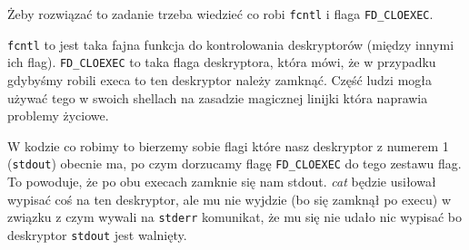 Żeby rozwiązać to zadanie trzeba wiedzieć co robi \texttt{fcntl} i flaga \texttt{FD\_CLOEXEC}.

\texttt{fcntl} to jest taka fajna funkcja do kontrolowania deskryptorów (między innymi ich flag). \texttt{FD\_CLOEXEC} to taka flaga deskryptora, która mówi, że w przypadku gdybyśmy robili execa to ten deskryptor należy zamknąć. Część ludzi mogła używać tego w swoich shellach na zasadzie magicznej linijki która naprawia problemy życiowe.

W kodzie co robimy to bierzemy sobie flagi które nasz deskryptor z numerem 1 (\texttt{stdout}) obecnie ma, po czym dorzucamy flagę \texttt{FD\_CLOEXEC} do tego zestawu flag. To powoduje, że po obu execach zamknie się nam stdout. \textit{cat} będzie usiłował wypisać coś na ten deskryptor, ale mu nie wyjdzie (bo się zamknął po execu) w związku z czym wywali na \texttt{stderr} komunikat, że mu się nie udało nic wypisać bo deskryptor \texttt{stdout} jest walnięty.

